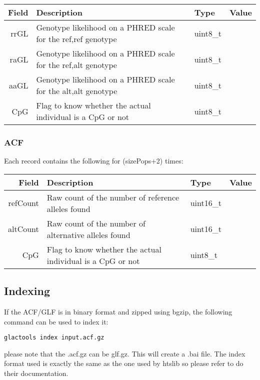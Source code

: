 \documentclass[a4paper]{article}
\begin{document}
\begin{tabular}{|r|p{7cm}|l|l|}
\hline
{\bf Field} & {\bf Description} & {\bf Type} & {\bf Value} \\
\hline
rrGL & Genotype likelihood on a PHRED scale for the ref,ref genotype & uint8\_t &  \\
\hline
raGL & Genotype likelihood on a PHRED scale for the ref,alt genotype & uint8\_t &  \\
\hline
aaGL & Genotype likelihood on a PHRED scale for the alt,alt genotype & uint8\_t &  \\
\hline
CpG & Flag to know whether the actual individual is a CpG or not & uint8\_t &  \\
\hline
\end{tabular}


\clearpage



\subsubsection{ACF}

\noindent Each record contains the following for (sizePops+2) times:

\begin{tabular}{|r|p{7cm}|l|l|}
\hline
{\bf Field} & {\bf Description} & {\bf Type} & {\bf Value} \\
\hline
refCount & Raw count of the number of reference alleles found & uint16\_t &  \\
\hline
altCount & Raw count of the number of alternative alleles found & uint16\_t &  \\
\hline
CpG & Flag to know whether the actual individual is a CpG or not & uint8\_t &  \\
\hline
\end{tabular}

\afterpage{\clearpage}


\subsection{Indexing}

\noindent If the ACF/GLF is in binary format and zipped using bgzip, the following command can be used to index it:
\begin{verbatim}
glactools index input.acf.gz
\end{verbatim}
\noindent please note that the .acf.gz can be glf.gz. This will create a .bai file. The index format used is exactly the same as the one used by htslib so please refer to do their documentation.
\end{document}
